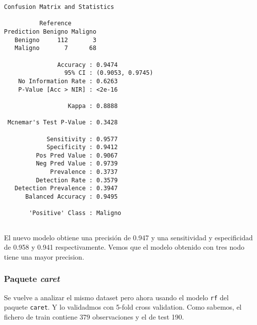 \documentclass[
]{article}
\begin{document}
\begin{verbatim}
Confusion Matrix and Statistics

          Reference
Prediction Benigno Maligno
   Benigno     112       3
   Maligno       7      68
                                          
               Accuracy : 0.9474          
                 95% CI : (0.9053, 0.9745)
    No Information Rate : 0.6263          
    P-Value [Acc > NIR] : <2e-16          
                                          
                  Kappa : 0.8888          
                                          
 Mcnemar's Test P-Value : 0.3428          
                                          
            Sensitivity : 0.9577          
            Specificity : 0.9412          
         Pos Pred Value : 0.9067          
         Neg Pred Value : 0.9739          
             Prevalence : 0.3737          
         Detection Rate : 0.3579          
   Detection Prevalence : 0.3947          
      Balanced Accuracy : 0.9495          
                                          
       'Positive' Class : Maligno         
                                          
\end{verbatim}

El nuevo modelo obtiene una precisión de 0.947 y una sensitividad y
especificidad de 0.958 y 0.941 respectivamente. Vemos que el modelo
obtenido con tres nodo tiene una mayor precision.

\hypertarget{paquete-caret-2}{%
\subsubsection{\texorpdfstring{Paquete
\emph{caret}}{Paquete caret}}\label{paquete-caret-2}}

Se vuelve a analizar el mismo dataset pero ahora usando el modelo
\texttt{rf} del paquete \texttt{caret}. Y lo validadmos con 5-fold cross
validation. Como sabemos, el fichero de train contiene 379 observaciones
y el de test 190.
\end{document}
